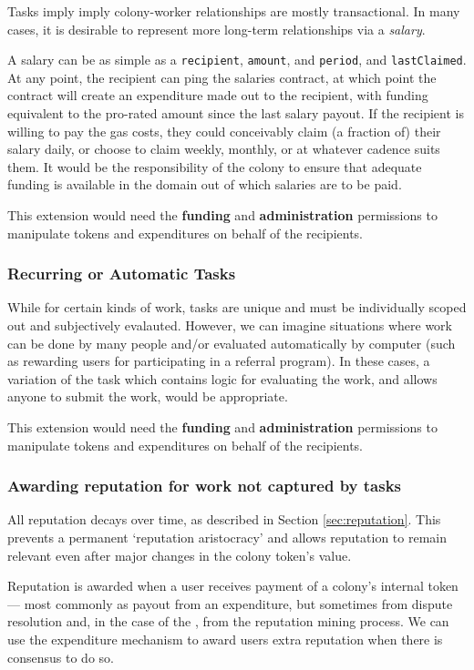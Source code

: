 Tasks imply imply colony-worker relationships are mostly transactional. In many cases, it is desirable to represent more long-term relationships via a \emph{salary}.

A salary can be as simple as a \texttt{recipient}, \texttt{amount}, and \texttt{period}, and \texttt{lastClaimed}. At any point, the recipient can ping the salaries contract, at which point the contract will create an expenditure made out to the recipient, with funding equivalent to the pro-rated amount since the last salary payout. If the recipient is willing to pay the gas costs, they could conceivably claim (a fraction of) their salary daily, or choose to claim weekly, monthly, or at whatever cadence suits them. It would be the responsibility of the colony to ensure that adequate funding is available in the domain out of which salaries are to be paid.

This extension would need the \textbf{funding} and \textbf{administration} permissions to manipulate tokens and expenditures on behalf of the recipients.

\subsubsection*{Recurring or Automatic Tasks}

While for certain kinds of work, tasks are unique and must be individually scoped out and subjectively evalauted. However, we can imagine situations where work can be done by many people and/or evaluated automatically by computer (such as rewarding users for participating in a referral program). In these cases, a variation of the task which contains logic for evaluating the work, and allows anyone to submit the work, would be appropriate.

This extension would need the \textbf{funding} and \textbf{administration} permissions to manipulate tokens and expenditures on behalf of the recipients.

\subsubsection{Awarding reputation for work not captured by tasks}

All reputation decays over time, as described in Section \ref{sec:reputation}. This prevents a permanent `reputation aristocracy' and allows reputation to remain relevant even after major changes in the colony token's value.

Reputation is awarded when a user receives payment of a colony's internal token --- most commonly as payout from an expenditure, but sometimes from dispute resolution and, in the case of the \rc, from the reputation mining process. We can use the expenditure mechanism to award users extra reputation when there is consensus to do so.

